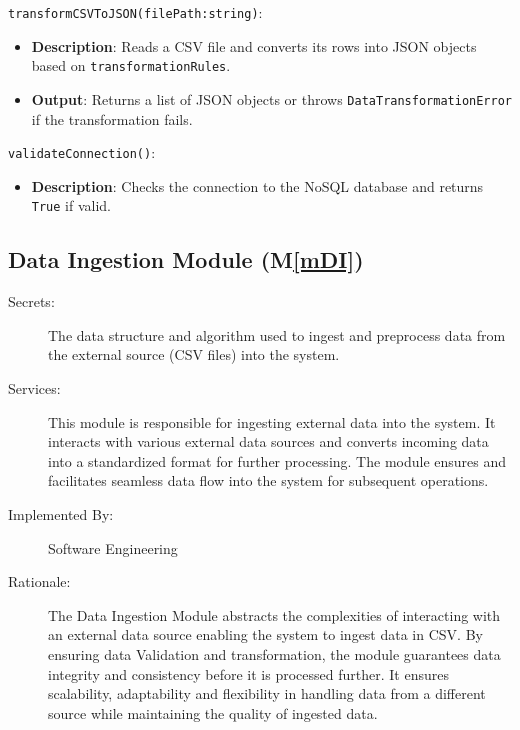 \documentclass[12pt, titlepage]{article}
\newcommand{\mref}[1]{M\ref{#1}}
\begin{document}
\begin{description}
  \item[Local Function:] 
  \item
\texttt{transformCSVToJSON(filePath:string)}:
  \item
  \begin{itemize}
    \item \textbf{Description}: Reads a CSV file and converts its rows into JSON objects based on
    \texttt{transformationRules}.
  \end{itemize}
  \item 
  \begin{itemize}
    \item \textbf{Output}: Returns a list of JSON objects or throws \texttt{DataTransformationError}
    if the transformation fails.
  \end{itemize}
  \item 
  \texttt{validateConnection()}:
  \item 
  \begin{itemize}
    \item \textbf{Description}: Checks the connection to the NoSQL database and returns \texttt{True}
    if valid.
  \end{itemize}
\end{description}

\subsection{Data Ingestion Module (\mref{mDI})}
\begin{description}
  \item[Secrets:] The data structure and algorithm used to ingest and preprocess data from
  the external source (CSV files) into the system.
  \item[Services:] This module is responsible for ingesting external data into the system.
  It interacts with various external data sources and converts incoming data into a 
  standardized format for further processing. The module ensures and facilitates seamless
  data flow into the system for subsequent operations.
  \item[Implemented By:] Software Engineering
  \item[Rationale:] The Data Ingestion Module abstracts the complexities of interacting with
  an external data source enabling the system to ingest data in CSV. By ensuring data Validation
  and transformation, the module guarantees data integrity and consistency before it is processed
  further. It ensures scalability, adaptability and flexibility in handling data from a different
  source while maintaining the quality of ingested data.
\end{description}
\end{document}
